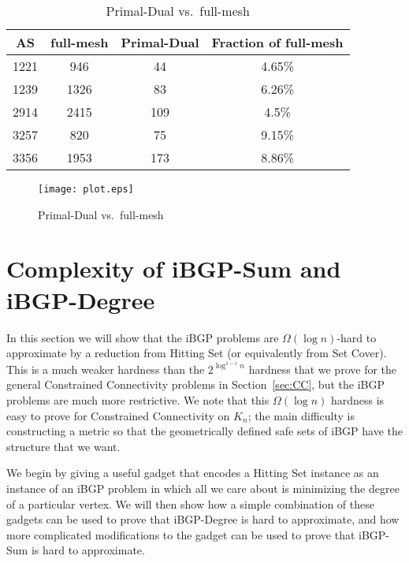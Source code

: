 \documentclass[11pt,letterpaper]{article}
\theoremstyle{definition}
\newcounter{note}[section]
\begin{document}
\begin{table}
\begin{center}
\begin{tabular}{|c|c|c|c|}
\hline
AS & full-mesh & Primal-Dual & Fraction of full-mesh \\
\hline
1221 & 946 & 44 & 4.65\% \\
1239 & 1326 & 83 & 6.26\% \\
2914 & 2415 & 109 & 4.5\% \\
3257 & 820 & 75 & 9.15\% \\
3356 & 1953 & 173 & 8.86\% \\
\hline
\end{tabular}
\end{center}
\caption{Primal-Dual vs.\ full-mesh}
\label{tab:results}
\end{table}

\begin{figure}
\begin{center}
\texttt{[image: plot.eps]}
\end{center}
\caption{Primal-Dual vs.\ full-mesh}
\label{fig:main}
\vspace*{-.2in}
\end{figure}




\section{Complexity of {\sc iBGP-Sum} and {\sc iBGP-Degree}} \label{sec:iBGP_hardness}

In this section we will show that the iBGP problems are $\Omega(\log
n)$-hard to approximate by a reduction from {\sc Hitting Set} (or
equivalently from {\sc Set Cover}).  This is a much weaker hardness
than the $2^{\log^{1-\epsilon} n}$ hardness that we prove for the general
Constrained Connectivity problems in Section~\ref{sec:CC}, but the iBGP problems are much more
restrictive.  We note that this $\Omega(\log n)$ hardness is easy to prove for Constrained Connectivity on $K_n$; the main difficulty is constructing a metric so that the geometrically defined safe sets of iBGP have the structure that we want.

We begin by giving a useful gadget that
encodes a {\sc Hitting Set} instance as an instance of an iBGP problem
in which all we care about is minimizing the degree of a particular
vertex.  We will then show how a simple combination of these gadgets
can be used to prove that {\sc iBGP-Degree} is hard to approximate,
and how more complicated modifications to the gadget can be used to
prove that {\sc iBGP-Sum} is hard to approximate.
\end{document}
